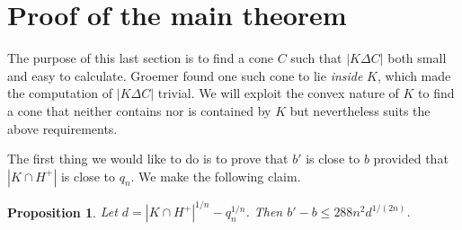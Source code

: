 \documentclass[12pt,reqno]{amsart}
\theoremstyle{plain}
\newtheorem{prop}[teor]{Proposition}
\theoremstyle{definition}
\theoremstyle{remark}
\numberwithin{equation}{section}
\begin{document}
\section{Proof of the main theorem}

The purpose of this last section is to find a cone $C$ such that $|K\Delta C|$ both small and easy to calculate. Groemer found one such cone to lie \textit{inside} $K$, which made the computation of $|K\Delta C|$ trivial. We will exploit the convex nature of $K$ to find a cone that neither contains nor is contained by $K$ but nevertheless suits the above requirements.

The first thing we would like to do is to prove that $b'$ is close to $b$ provided that $|K\cap H^+|$ is close to $q_n$. We make the following claim.

\begin{prop}\label{bprimebbound}
Let $d=|K\cap H^+|^{1/n}-q_n^{1/n}$. Then $b'-b\leq 288n^2 d^{1/(2n)}$.
\end{prop}
\end{document}
